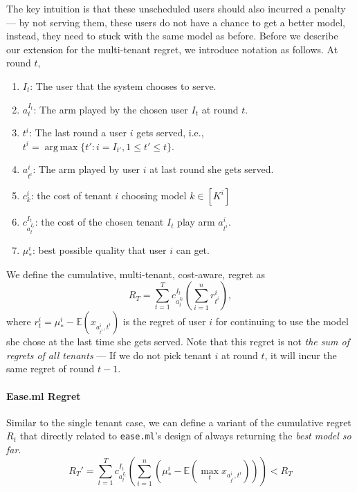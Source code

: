 \documentclass[letterpaper]{vldb}
\newcommand{\eml}{\texttt{ease.ml}\xspace}
\DeclareMathOperator*{\argmax}{arg\,max}
\begin{document}
The key intuition is that these unscheduled users should
also incurred a penalty --- by not serving them,
these users do not have a chance to
get a better model, instead, they need to stuck
with the same model as before. 
Before we describe our extension for the
multi-tenant regret, we introduce notation
as follows. At round $t$,
\begin{enumerate}[noitemsep,topsep=0pt,parsep=0pt,partopsep=0pt]
\item $I_t$: The user that the system chooses to
serve.
\item $a_{t}^{I_t}$: The arm played by the chosen user $I_t$ at round $t$.
\item $t^i$: The last round a user $i$ gets served, i.e., $t^i = \argmax\{t': i=I_{t'}, 1\le t'\le t\}$.
\item $a_{t^i}^i$: The arm played by user $i$ at last round she gets served.
\item $c^i_k$: the cost of tenant $i$ choosing model $k\in [K^i]$
\item $c^{I_t}_{a_{t}^{I_t}}$: the cost of the chosen
tenant $I_t$ play arm $a_{t^i}^i$.
\item $\mu_*^i$: best possible quality that 
user $i$ can get.
\end{enumerate}

We define the cumulative,
multi-tenant, cost-aware, regret as
\[
R_T = \sum_{t=1}^T c^{I_t}_{a_{t}^{I_t}} \left (\sum_{i=1}^n r^i_{t^i} \right),
\]
where $r^i_t = \mu_*^i - \mathbb{E}(x_{a_{t^i}^i, t^i})$
is the regret of user $i$ for continuing to
use the model she chose at the last time she
gets served. 
Note that this regret is not {\em the sum of 
regrets of all tenants} --- If we do not pick tenant $i$ at round $t$, it will incur the same regret 
of round $t-1$.

\paragraph*{Ease.ml Regret} Similar to
the single tenant case, we can define
a variant of the cumulative 
regret $R_t$ that directly related to
\eml's design of always returning the
{\em best model so far}. 
\[
R_T' = \sum_{t=1}^T
c^{I_t}_{a_{t}^{I_t}} 
\left(
\sum_{i=1}^n 
\left(
\mu_*^i - \mathbb{E}(\max_t x_{a_{t^i}^i, t^i})
\right)
\right) < R_T
\]
\end{document}
